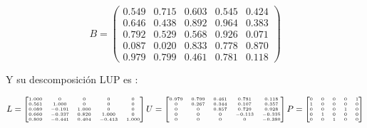 \documentclass[12pt,letterpaper]{article}
\begin{document}
\begin{equation*}
    B = \begin{pmatrix}
 			0.549 & 0.715 & 0.603 & 0.545 & 0.424 \\
			0.646 & 0.438 & 0.892 & 0.964 & 0.383 \\
			0.792 & 0.529 & 0.568 & 0.926 & 0.071 \\
			0.087 & 0.020 & 0.833 & 0.778 & 0.870 \\
			0.979 & 0.799 & 0.461 & 0.781 & 0.118 
        \end{pmatrix}
\end{equation*}

Y su descomposici\'on LUP es :

\begin{equation*}
    \tiny{
    L = \begin{bmatrix}                                                           
 			1.000 &  0     & 0     &  0     & 0     \\
            0.561 &  1.000 & 0     &  0     & 0     \\
            0.089 & -0.191 & 1.000 &  0     & 0     \\
            0.660 & -0.337 & 0.820 &  1.000 & 0     \\
            0.809 & -0.441 & 0.404 & -0.413 & 1.000
		\end{bmatrix}
    U = \begin{bmatrix}                                                           
	        0.979 & 0.799 & 0.461 &  0.781 &  0.118 \\
			0     & 0.267 & 0.344 &  0.107 &  0.357 \\
			0     & 0     & 0.857 &  0.729 &  0.928 \\
			0     & 0     & 0     & -0.113 & -0.335 \\
			0     & 0     & 0     &  0     & -0.380                                
		\end{bmatrix}
    P = \begin{bmatrix}                                                           
			0 & 0 & 0 & 0 & 1 \\
			1 & 0 & 0 & 0 & 0 \\
			0 & 0 & 0 & 1 & 0 \\
			0 & 1 & 0 & 0 & 0 \\
			0 & 0 & 1 & 0 & 0                                              
		\end{bmatrix}
	}
\end{equation*}
\end{document}
